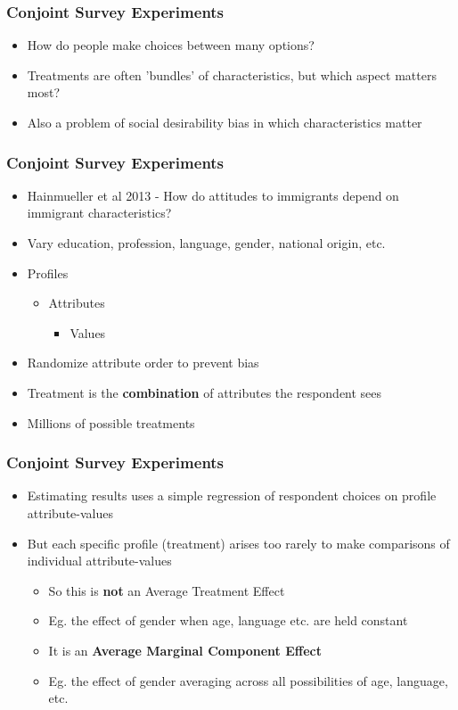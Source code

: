 \documentclass[xcolor=x11names,compress]{beamer}\usepackage[]{graphicx}\usepackage[]{color}
\renewcommand{\(}{\begin{columns}}
\renewcommand{\)}{\end{columns}}
\newcommand{\<}[1]{\begin{column}{#1}}
\renewcommand{\>}{\end{column}}
\begin{document}
\begin{frame}
\frametitle{Conjoint Survey Experiments}
\begin{itemize}
\item How do people make choices between many options?
\pause
\item Treatments are often 'bundles' of characteristics, but which aspect matters most?
\pause
\item Also a problem of social desirability bias in which characteristics matter
\end{itemize}
\end{frame}

\begin{frame}
\frametitle{Conjoint Survey Experiments}
\begin{itemize}
\item Hainmueller et al 2013 - How do attitudes to immigrants depend on immigrant characteristics?
\pause
\item Vary education, profession, language, gender, national origin, etc.
\pause
\item Profiles
\begin{itemize}
\item Attributes
\begin{itemize}
\item Values
\end{itemize}
\end{itemize}
\pause
\item Randomize attribute order to prevent bias
\pause
\item Treatment is the \textbf{combination} of attributes the respondent sees
\pause
\item Millions of possible treatments
\end{itemize}
\end{frame}





\begin{frame}
\frametitle{Conjoint Survey Experiments}
\begin{itemize}
\item Estimating results uses a simple regression of respondent choices on profile attribute-values
\pause
\item But each specific profile (treatment) arises too rarely to make comparisons of individual attribute-values
\pause
\begin{itemize}
\item So this is \textbf{not} an Average Treatment Effect
\pause
\item Eg. the effect of gender when age, language etc. are held constant
\pause
\item It is an \textbf{Average Marginal Component Effect}
\pause
\item Eg. the effect of gender averaging across all possibilities of age, language, etc.
\end{itemize}
\end{itemize}
\end{frame}
\end{document}
